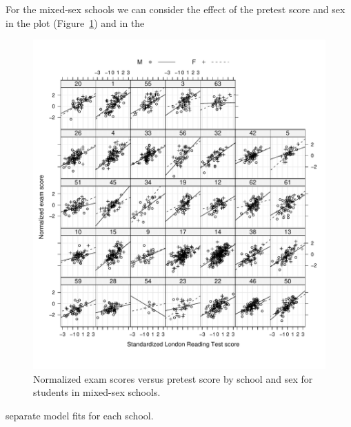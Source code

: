 \documentclass[12pt]{article}
\begin{document}
For the mixed-sex schools we can consider the effect of the pretest
score and sex in the plot (Figure~\ref{fig:Examplot6}) and in the
\begin{figure}[tbp]
  \centering
  \includegraphics[width=\textwidth]{figs/SoftRev-Examplot6}
  \caption{Normalized exam scores versus pretest
    score by school and sex for students in mixed-sex
    schools.}
  \label{fig:Examplot6}
\end{figure}
separate model fits for each school.
\end{document}
